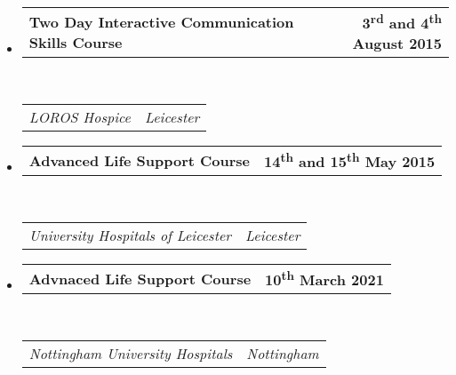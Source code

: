 \documentclass{article}
\makeatletter
\newcommand{\headerrow}[2]
{\begin{tabular*}{\linewidth}{l@{\extracolsep{\fill}}r}
	#1 &
	#2 \\
\end{tabular*}}
\makeatother
\begin{document}
\begin{itemize}
	\item
	\headerrow
		{\textbf{Two Day Interactive Communication Skills Course}}
		{\textbf{3\textsuperscript{rd} and 4\textsuperscript{th} August 2015}}
	\\
	\headerrow
		{\emph{LOROS Hospice}}
		{\emph{Leicester}}

	\item
	\headerrow
		{\textbf{Advanced Life Support Course}}
		{\textbf{14\textsuperscript{th} and 15\textsuperscript{th} May 2015}}
	\\
	\headerrow
		{\emph{University Hospitals of Leicester}}
		{\emph{Leicester}}
	
	\item
	\headerrow
		{\textbf{Advnaced Life Support Course}}
		{\textbf{10\textsuperscript{th} March 2021}}
	\\
	\headerrow
		{\emph{Nottingham University Hospitals}}
		{\emph{Nottingham}}

\end{itemize}
\end{document}
